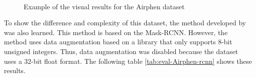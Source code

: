 \documentclass[../thesis.tex]{subfiles}
\begin{document}
\begin{figure}[H]
         \\
        
        
        \caption{Example of the visual results for the Airphen dataset}
        \label{fig:07-Airphen-0}
    \end{figure}
    
    To show the difference and complexity of this dataset, the method developed by \cite{ward2020scalable} was also learned. This method is based on the Mask-RCNN. However, the method uses data augmentation based on a library that only supports 8-bit unsigned integers. Thus, data augmentation was disabled because the dataset uses a 32-bit float format. The following table \ref{tab:eval-Airphen-rcnn} shows these results.
    
\end{document}
